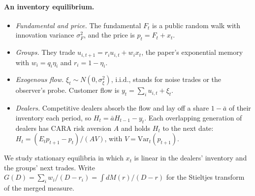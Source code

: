 \documentclass[12pt]{article}
\theoremstyle{definition}
\theoremstyle{remark}
\begin{document}
\paragraph{An inventory equilibrium.}
\begin{itemize}[itemsep=1pt,topsep=2pt]
\item \emph{Fundamental and price.} The fundamental $F_t$ is a public random walk with innovation variance $\sigma_F^2$, and the price is $p_t=F_t+x_t$.
\item \emph{Groups.} They trade $u_{i,t+1}=r_iu_{i,t}+w_ix_t$, the paper's exponential memory with $w_i=q_i\eta_i$ and $r_i=1-\eta_i$.
\item \emph{Exogenous flow.} $\xi_t\sim N(0,\sigma_\xi^2)$, i.i.d., stands for noise trades or the observer's probe. Customer flow is $y_t=\sum_iu_{i,t}+\xi_t$.
\item \emph{Dealers.} Competitive dealers absorb the flow and lay off a share $1-\bar a$ of their inventory each period, so $H_t=\bar aH_{t-1}-y_t$. Each overlapping generation of dealers has CARA risk aversion $A$ and holds $H_t$ to the next date: $H_t=(E_tp_{t+1}-p_t)/(AV)$, with $V=\mathrm{Var}_t(p_{t+1})$.
\end{itemize}
We study stationary equilibria in which $x_t$ is linear in the dealers' inventory and the groups' next trades. Write $G(D)=\sum_iw_i/(D-r_i)=\int dM(r)/(D-r)$ for the Stieltjes transform of the merged measure.
\end{document}
